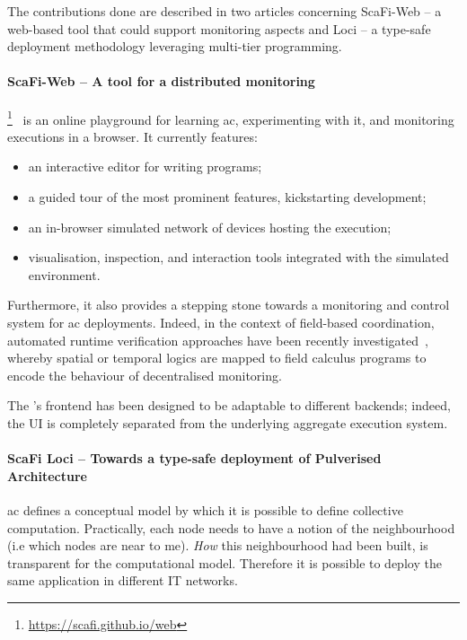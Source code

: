 \documentclass[11pt]{article}
\begin{document}
The contributions done are described in two articles concerning ScaFi-Web -- a web-based tool that could support monitoring aspects and \scafi Loci -- a type-safe deployment methodology leveraging multi-tier programming.
\paragraph{ScaFi-Web -- A tool for a distributed monitoring} \label{scafi-web}
\scafiweb{}\footnote{\url{https://scafi.github.io/web}}~\cite{DBLP:conf/coordination/AguzziCMPV21}
 is an online playground for learning \ac{ac}, experimenting with it, and monitoring executions in a browser.
It currently features:
\begin{itemize}
 \item an interactive editor for writing \scafi{} programs;
 \item a guided tour of the most prominent features, kickstarting development;
 \item an in-browser simulated network of devices hosting the execution;
 \item visualisation, inspection, and interaction tools integrated with the simulated environment.
\end{itemize}

Furthermore, it also provides a stepping stone towards a monitoring and control system for \ac{ac} deployments.
Indeed, in the context of field-based coordination, automated runtime verification approaches have been recently investigated~\cite{DBLP:journals/jss/AudritoCDSV21}, whereby spatial or temporal logics are mapped to field calculus programs to encode the behaviour of decentralised monitoring.

The \scafiweb{}'s frontend has been designed to be adaptable to different backends; indeed, the UI is completely separated from the underlying aggregate execution system. 

\paragraph{ScaFi Loci -- Towards a type-safe deployment of Pulverised Architecture}
\ac{ac} defines a conceptual model by which it is possible to define collective computation. Practically, each node needs to have a notion of the neighbourhood (i.e which nodes are near to me). \textit{How} this neighbourhood had been built, is transparent for the computational model. Therefore it is possible to deploy the same application in different IT networks.
\end{document}
